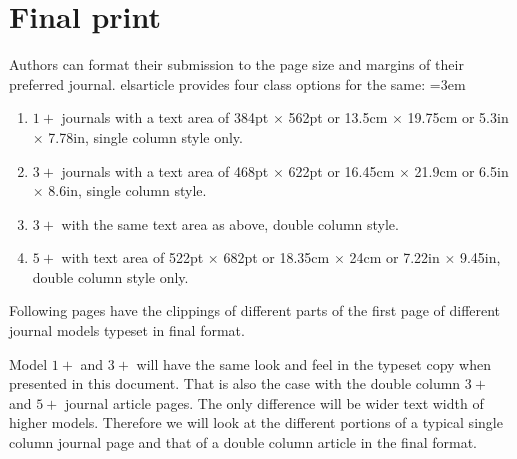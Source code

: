 \documentclass[a4paper,12pt]{article}
\def\file#1{\textsf{#1}\xspace}
\begin{document}
\section{Final print}\label{sec:final}
\hypertarget{final}{}

Authors can format their submission to the page size and margins
of their preferred journal.  \file{elsarticle} provides four
class options for the same:
\lmrgn=3em
\begin{enumerate}
\advance\itemsep4pt
\item [\texttt{1p}:] $1+$ journals with a text area of
384pt $\times$ 562pt or 13.5cm $\times$ 19.75cm or 5.3in $\times$
7.78in, single column style only.

\item [\texttt{3p}:] $3+$ journals with a text area of 468pt
$\times$ 622pt or 16.45cm $\times$ 21.9cm or 6.5in $\times$
8.6in, single column style.

\item [\texttt{3pd}:] $3+$ with the same text area as above,
double column style.

\item [\texttt{5p}:] $5+$ with text area of 522pt $\times$
682pt or 18.35cm $\times$ 24cm or 7.22in $\times$ 9.45in,
double column style only.
\end{enumerate}

Following pages have the clippings of different parts of
the first page of different journal models typeset in final
format.

\bigskip
\mywidth=14cm
\def\rulecolor{blue!70}
\def\rulecolor{orange}

\newpage
\vspace*{-18pt}
\def\rulecolor{blue!70}
\def\rulecolor{orange}

\medskip

\noindent
Model $1+$ and $3+$  will have the same look and
feel in the typeset copy when presented in this document. That is
also the case with the double column $3+$ and $5+$ journal article
pages. The only difference will be wider text width of
higher models.  Therefore we will look at the
different portions of a typical single column journal page and
that of a double column article in the final format.

\newpage
\vspace*{-18pt}
\def\rulecolor{blue!70}
\def\rulecolor{orange}
\end{document}
